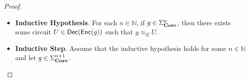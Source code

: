 \begin{proof}
\begin{itemize}
\begin{enumerate}
\begin{align*}
                    \overset{\HqcPowId}{\approx}
                    \scalebox{0.65}{\circimg{tikz-cache/proofs__round_c5_3.pdf}}
                    \overset{\HqcPowDag}{\approx}
                    \scalebox{0.65}{\circimg{tikz-cache/proofs__round_c5_4.pdf}}
                    \overunderset{\HqcPowCong}{\HqcTargMDef}{\approx}
                    \scalebox{0.65}{\circimg{tikz-cache/encoder__eqn5_lhs.pdf}}
                \end{align*}
          \item Assume that $g = \scalebox{0.65}{\circimg{tikz-cache/encoder__eqn2_lhs.pdf}}$.
                It follows from cases (3--4) that following equation holds.
                \begin{align*}
                    \scalebox{0.65}{\circimg{tikz-cache/proofs__round_c2_1.pdf}}
                    \in
                    \decoder\left(
                        \scalebox{0.65}{\circimg{tikz-cache/encoder__eqn2_rhs.pdf}}
                    \right)
                    =
                    \decoder\left( \encoder\left(
                        \scalebox{0.65}{\circimg{tikz-cache/encoder__eqn2_lhs.pdf}}
                    \right) \right)
                \end{align*}
                Then the following derivation holds.
                \begin{align*}
                    \scalebox{0.65}{\circimg{tikz-cache/proofs__round_c2_1.pdf}}
                    \overset{\HqcPowId}{\approx}
                    \scalebox{0.65}{\circimg{tikz-cache/proofs__round_c2_2.pdf}}
                    \overset{\HqcPowId}{\approx}
                    \scalebox{0.65}{\circimg{tikz-cache/proofs__round_c2_3.pdf}}
                    \overset{\HqcPowDag}{\approx}
                    \scalebox{0.65}{\circimg{tikz-cache/proofs__round_c2_4.pdf}}
                    \overunderset{\HqcPowCong}{\HqcTargMDef}{\approx}
                    \scalebox{0.65}{\circimg{tikz-cache/encoder__eqn2_lhs.pdf}}
                \end{align*}
          \end{enumerate}
          In each case, there exists a $U \in \decoder( \encoder( g ) )$ such that $g \approx_E U$.
    \item \textbf{Inductive Hypothesis}.
          For each $n \in \mathbb{N}$, if $g \in \Sigma_{\mathbf{Core}}^n$, then there exists some circuit $U \in \decoder( \encoder( g ) )$ such that $g \approx_E U$.
    \item \textbf{Inductive Step}.
          Assume that the inductive hypothesis holds for some $n \in \mathbb{N}$ and let $g \in \Sigma_{\mathbf{Core}}^{n+1}$.

\end{itemize}
\end{proof}
